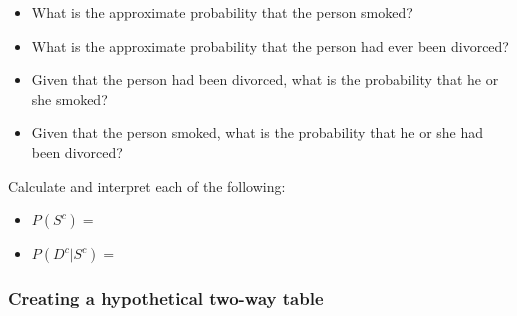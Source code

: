 \documentclass[
]{report}
\providecommand{\tightlist}{%
  \setlength{\itemsep}{0pt}\setlength{\parskip}{0pt}}
\begin{document}
\begin{itemize}
\tightlist
\item
  What is the approximate probability that the person smoked?
\end{itemize}

\vspace{0.5in}

\begin{itemize}
\tightlist
\item
  What is the approximate probability that the person had ever been divorced?
\end{itemize}

\vspace{0.5in}

\begin{itemize}
\tightlist
\item
  Given that the person had been divorced, what is the probability that he or she smoked?
\end{itemize}

\vspace{0.5in}

\begin{itemize}
\tightlist
\item
  Given that the person smoked, what is the probability that he or she had been divorced?
\end{itemize}

\vspace{0.5in}

Calculate and interpret each of the following:


\begin{itemize}
\tightlist
\item
  \(P(S^c)=\)
\end{itemize}

\vspace{0.6in}

\begin{itemize}
\tightlist
\item
  \(P(D^c|S^c)=\)
\end{itemize}

\vspace{0.6in}


\hypertarget{creating-a-hypothetical-two-way-table}{%
\subsubsection*{Creating a hypothetical two-way table}\label{creating-a-hypothetical-two-way-table}}
\end{document}
